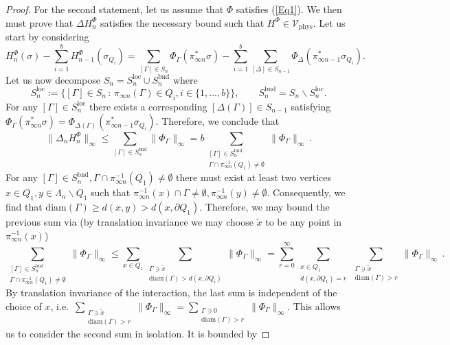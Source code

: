 \documentclass{article}
\newcommand{\diam}{\mathrm{diam}}
\newcommand{\loc}{\mathrm{loc}}
\newcommand{\bnd}{\mathrm{bnd}}
\newcommand{\phys}{\mathrm{phys}}
\begin{document}
\begin{proof}
    For the second statement, let us assume that $\Phi$ satisfies (\ref{Eq1}). We then must prove that $\Delta H_n^\Phi$ satisfies the necessary bound such that $H^\Phi\in \mathcal{V}_\phys$. Let us start by considering
    \begin{equation}
        H_{n}^\Phi(\sigma)-\sum_{i=1}^bH_{n-1}^\Phi(\sigma_{Q_i})=\sum_{[\Gamma]\in S_n}\Phi_\Gamma(\pi_{\infty n}^*\sigma)-\sum_{i=1}^b\sum_{[\Delta]\in S_{n-1}}\Phi_\Delta(\pi_{\infty n-1}^*\sigma_{Q_i}).
    \end{equation}
    Let us now decompose $S_n=S^\loc_n\cup S_n^\bnd$ where
    \begin{equation}
        S_n^\loc:=\{[\Gamma]\in S_n\,:\,\pi_{\infty n}(\Gamma)\in Q_i,i\in\{1,...,b\}\},\qquad S_n^\bnd=S_n\backslash S_n^\loc.
    \end{equation}
    For any $[\Gamma]\in S_n^\loc$ there exists a corresponding $[\Delta(\Gamma)]\in S_{n-1}$ satisfying $\Phi_\Gamma(\pi_{\infty n}^*\sigma)=\Phi_{\Delta(\Gamma)}(\pi_{\infty n-1}^*\sigma_{Q_i})$. Therefore, we conclude that
    \begin{equation}
        \|\Delta _nH_n^\Phi\|_\infty\leq\sum_{[\Gamma]\in S_n^\bnd}\|\Phi_\Gamma\|_\infty=b\sum_{\substack{[\Gamma]\in S_n^\bnd\\\Gamma\cap \pi_{\infty n}^{-1}(Q_1)\ne\emptyset}}\|\Phi_\Gamma\|_\infty\,.
    \end{equation}
    For any $[\Gamma]\in S_n^\bnd,\Gamma\cap\pi_{\infty n}^{-1}(Q_1)\neq\emptyset$ there must exist at least two vertices $x\in Q_1,y\in \Lambda_n\backslash Q_1$ such that $\pi_{\infty n}^{-1}(x)\cap\Gamma\neq\emptyset,\pi_{\infty n}^{-1}(y)\neq\emptyset$. Consequently, we find that $\diam(\Gamma)\geq d(x,y)> d(x,\partial Q_1)$. Therefore, we may bound the previous sum via (by translation invariance we may choose $\tilde x$ to be any point in $\pi_{\infty n}^{-1}(x)$) 
    \begin{equation}
        \sum_{\substack{[\Gamma]\in S_n^\bnd\\\Gamma\cap\pi_{\infty n}^{-1}(Q_1)\ne\emptyset}}\|\Phi_\Gamma\|_\infty\leq\sum_{x\in Q_1}\sum_{\substack{\Gamma\ni\tilde x\\\diam(\Gamma)> d(x,\partial Q_i)}}\|\Phi_\Gamma\|_\infty=\sum_{r=0}^\infty\sum_{\substack{x\in Q_1\\d(x,\partial Q_1)=r}}\sum_{\substack{\Gamma\ni\tilde x\\\diam(\Gamma)>r}}\|\Phi_\Gamma\|_\infty\,.
    \end{equation}
    By translation invariance of the interaction, the last sum is independent of the choice of $x$, i.e.\ $\sum_{\substack{\Gamma\ni\tilde x\\\diam(\Gamma)>r}}\|\Phi_\Gamma\|_\infty=\sum_{\substack{\Gamma\ni0\\\diam(\Gamma)>r}}\|\Phi_\Gamma\|_\infty$. This allows us to consider the second sum in isolation. It is bounded by

\end{proof}
\end{document}

